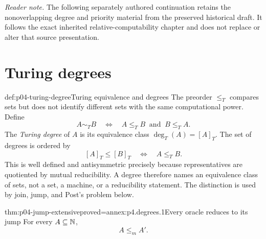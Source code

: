 
\noindent\textit{Reader note.}
The following separately authored continuation retains the nonoverlapping
degree and priority material from the preserved historical draft.  It follows
the exact inherited relative-computability chapter and does not replace or
alter that source presentation.

\section{Turing degrees}
\label{sec:p04-turing-degrees}

\begin{hbdefinition}{def:p04-turing-degree}{Turing equivalence and degrees}
The preorder \(\leq_T\) compares sets but does not identify different sets
with the same computational power.  Define
\[
 A\sim_TB\quad\Leftrightarrow\quad
 A\leq_TB\ \text{ and }\ B\leq_TA.
\]
The \emph{Turing degree} of \(A\) is its equivalence class
\(\deg_T(A)=[A]_T\).  The set of degrees is ordered by
\[
 [A]_T\leq[B]_T\quad\Leftrightarrow\quad A\leq_TB.
\]
This is well defined and antisymmetric precisely because representatives are
quotiented by mutual reducibility.  A degree therefore names an equivalence
class of sets, not a set, a machine, or a reducibility statement.  The
distinction is used by join, jump, and Post's problem below.
\end{hbdefinition}

\begin{hblemma}{thm:p04-jump-extensive}{proved=annex:p4.degrees.1}{Every oracle reduces to its jump}
For every \(A\subseteq\mathbb{N}\),
\[
 A\leq_m A'.
\]
\end{hblemma}

